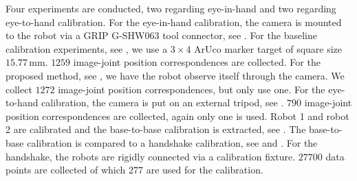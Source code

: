 Four experiments are conducted, two regarding eye-in-hand and two regarding eye-to-hand calibration. For the eye-in-hand calibration, the camera is mounted to the robot via a GRIP G-SHW063 tool connector, see . For the baseline calibration experiments, see , we use a $3\times4$ ArUco marker target of square size $15.77\,\text{mm}$. $1259$ image-joint position correspondences are collected. For the proposed method, see , we have the robot observe itself through the camera. We collect $1272$ image-joint position correspondences, but only use one. For the eye-to-hand calibration, the camera is put on an external tripod, see . $790$ image-joint position correspondences are collected, again only one is used. Robot 1 and robot 2 are calibrated and the base-to-base calibration is extracted, see . The base-to-base calibration is compared to a handshake calibration, see  and . For the handshake, the robots are rigidly connected via a calibration fixture. $27700$ data points are collected of which $277$ are used for the calibration.

